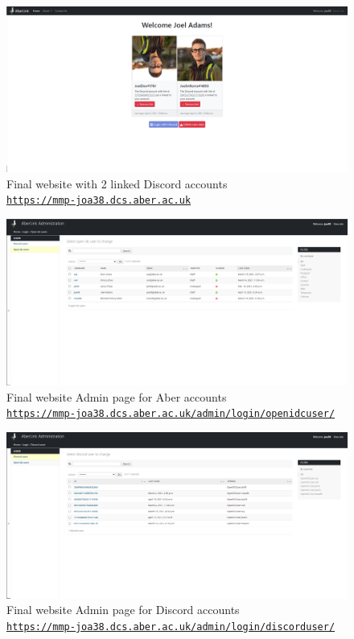 \begin{figure}[H]
	\centering
	\includegraphics[width=1\linewidth]{Figures/website-acc-2.png}
	\caption{Final website with 2 linked Discord accounts \\\centering\href{https://mmp-joa38.dcs.aber.ac.uk}{\nolinkurl{https://mmp-joa38.dcs.aber.ac.uk}}}
	\label{fig:final-web-acc-2}
\end{figure}

\begin{figure}[H]
	\centering
	\includegraphics[width=1\linewidth]{Figures/website-admin-openidc.png}
	\caption{Final website Admin page for Aber accounts \\\centering\href{https://mmp-joa38.dcs.aber.ac.uk/admin/login/openidcuser/}{\nolinkurl{https://mmp-joa38.dcs.aber.ac.uk/admin/login/openidcuser/}}}
	\label{fig:final-web-admin-openidc}
\end{figure}

\begin{figure}[H]
	\centering
	\includegraphics[width=1\linewidth]{Figures/website-admin-discord.png}
	\caption{Final website Admin page for Discord accounts \\\centering\href{https://mmp-joa38.dcs.aber.ac.uk/admin/login/discorduser/}{\nolinkurl{https://mmp-joa38.dcs.aber.ac.uk/admin/login/discorduser/}}}
	\label{fig:final-web-admin-dis}
\end{figure}

